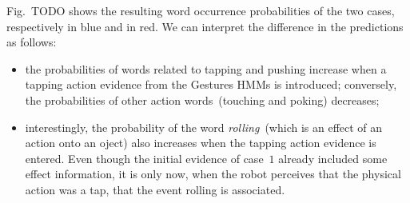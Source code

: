 Fig.~TODO shows the resulting word occurrence probabilities of the two cases, respectively in blue and in red. We can interpret the difference in the predictions as follows:
\begin{itemize}
\item the probabilities of words related to tapping and pushing increase when a tapping action evidence from the Gestures \acp{HMM} is introduced; conversely, the probabilities of other action words~(touching and poking) decreases;

\item interestingly, the probability of the word \emph{rolling}~(which is an effect of an action onto an oject) also increases when the tapping action evidence is entered. Even though the initial evidence of case~$1$ already included some effect information, it is only now, when the robot perceives that the physical action was a tap, that the event rolling is associated.
\end{itemize}


